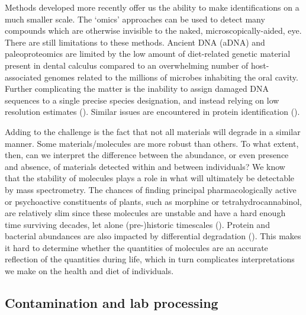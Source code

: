\documentclass[
  b5paper,
]{book}
\begin{document}
Methods developed more recently offer us the ability to make
identifications on a much smaller scale. The `omics' approaches can be
used to detect many compounds which are otherwise invisible to the
naked, microscopically-aided, eye. There are still limitations to these
methods. Ancient DNA (aDNA) and paleoproteomics are limited by the low
amount of diet-related genetic material present in dental calculus
compared to an overwhelming number of host-associated genomes related to
the millions of microbes inhabiting the oral cavity. Further
complicating the matter is the inability to assign damaged DNA sequences
to a single precise species designation, and instead relying on low
resolution estimates (). Similar issues are encountered in protein identification
().

Adding to the challenge is the fact that not all materials will degrade
in a similar manner. Some materials/molecules are more robust than
others. To what extent, then, can we interpret the difference between
the abundance, or even presence and absence, of materials detected
within and between individuals? We know that the stability of molecules
plays a role in what will ultimately be detectable by mass spectrometry.
The chances of finding principal pharmacologically active or
psychoactive constituents of plants, such as morphine or
tetrahydrocannabinol, are relatively slim since these molecules are
unstable and have a hard enough time surviving decades, let alone
(pre-)historic timescales
(). Protein and
bacterial abundances are also impacted by differential degradation
(). This makes it
hard to determine whether the quantities of molecules are an accurate
reflection of the quantities during life, which in turn complicates
interpretations we make on the health and diet of individuals.

\subsection{Contamination and lab
processing}\label{contamination-and-lab-processing}
\end{document}
